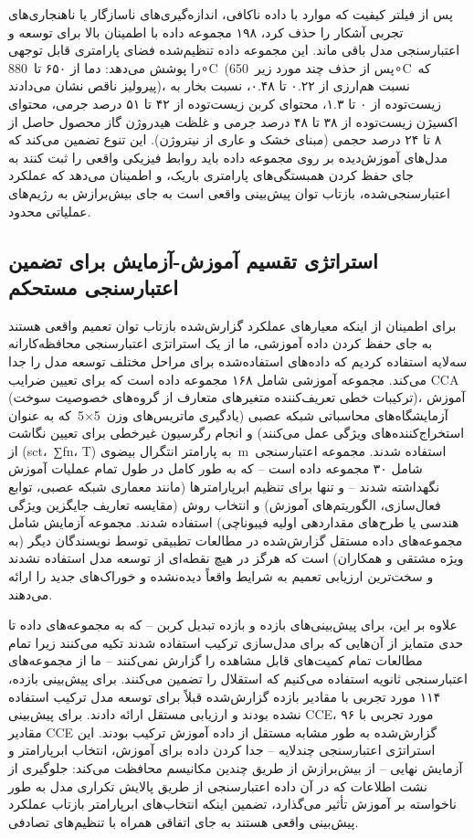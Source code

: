 \documentclass[12pt, a4paper]{article}
\begin{document}
پس از فیلتر کیفیت که موارد با داده ناکافی، اندازه‌گیری‌های ناسازگار یا ناهنجاری‌های تجربی آشکار را حذف کرد، ۱۹۸ مجموعه داده با اطمینان بالا برای توسعه و اعتبارسنجی مدل باقی ماند. این مجموعه داده تنظیم‌شده فضای پارامتری قابل توجهی را پوشش می‌دهد: دما از ۶۵۰ تا 880∘C (پس از حذف چند مورد زیر 650∘C که پیرولیز ناقص نشان می‌دادند)، نسبت هم‌ارزی از ۰.۲۲ تا ۰.۴۸، نسبت بخار به زیست‌توده از ۰ تا ۱.۳، محتوای کربن زیست‌توده از ۴۲ تا ۵۱ درصد جرمی، محتوای اکسیژن زیست‌توده از ۳۸ تا ۴۸ درصد جرمی و غلظت هیدروژن گاز محصول حاصل از ۸ تا ۲۴ درصد حجمی (مبنای خشک و عاری از نیتروژن). این تنوع تضمین می‌کند که مدل‌های آموزش‌دیده بر روی مجموعه داده باید روابط فیزیکی واقعی را ثبت کنند به جای حفظ کردن همبستگی‌های پارامتری باریک، و اطمینان می‌دهد که عملکرد اعتبارسنجی‌شده، بازتاب توان پیش‌بینی واقعی است به جای بیش‌برازش به رژیم‌های عملیاتی محدود.

\subsection{استراتژی تقسیم آموزش-آزمایش برای تضمین اعتبارسنجی مستحکم}

برای اطمینان از اینکه معیارهای عملکرد گزارش‌شده بازتاب توان تعمیم واقعی هستند به جای حفظ کردن داده آموزشی، ما از یک استراتژی اعتبارسنجی محافظه‌کارانه سه‌لایه استفاده کردیم که داده‌های استفاده‌شده برای مراحل مختلف توسعه مدل را جدا می‌کند. مجموعه آموزشی شامل ۱۶۸ مجموعه داده است که برای تعیین ضرایب CCA (ترکیبات خطی تعریف‌کننده متغیرهای متعارف از گروه‌های خصوصیت سوخت)، آموزش آزمایشگاه‌های محاسباتی شبکه عصبی (یادگیری ماتریس‌های وزن 5×5 که به عنوان استخراج‌کننده‌های ویژگی عمل می‌کنند) و انجام رگرسیون غیرخطی برای تعیین نگاشت از (sct، ∑fn، T) به پارامتر انتگرال بیضوی m استفاده شدند. مجموعه اعتبارسنجی شامل ۳۰ مجموعه داده است – که به طور کامل در طول تمام عملیات آموزش نگهداشته شدند – و تنها برای تنظیم ابرپارامترها (مانند معماری شبکه عصبی، توابع فعال‌سازی، الگوریتم‌های آموزش) و انتخاب روش (مقایسه تعاریف جایگزین ویژگی هندسی یا طرح‌های مقداردهی اولیه فیبوناچی) استفاده شدند. مجموعه آزمایش شامل مجموعه‌های داده مستقل گزارش‌شده در مطالعات تطبیقی توسط نویسندگان دیگر (به ویژه مشتقی و همکاران) است که هرگز در هیچ نقطه‌ای از توسعه مدل استفاده نشدند و سخت‌ترین ارزیابی تعمیم به شرایط واقعاً دیده‌نشده و خوراک‌های جدید را ارائه می‌دهند.

علاوه بر این، برای پیش‌بینی‌های بازده و بازده تبدیل کربن – که به مجموعه‌های داده تا حدی متمایز از آن‌هایی که برای مدل‌سازی ترکیب استفاده شدند تکیه می‌کنند زیرا تمام مطالعات تمام کمیت‌های قابل مشاهده را گزارش نمی‌کنند – ما از مجموعه‌های اعتبارسنجی ثانویه استفاده می‌کنیم که استقلال را تضمین می‌کنند. برای پیش‌بینی بازده، ۱۱۴ مورد تجربی با مقادیر بازده گزارش‌شده قبلاً برای توسعه مدل ترکیب استفاده نشده بودند و ارزیابی مستقل ارائه دادند. برای پیش‌بینی CCE، ۹۶ مورد تجربی با مقادیر CCE گزارش‌شده به طور مشابه مستقل از داده آموزش ترکیب بودند. این استراتژی اعتبارسنجی چندلایه – جدا کردن داده برای آموزش، انتخاب ابرپارامتر و آزمایش نهایی – از بیش‌برازش از طریق چندین مکانیسم محافظت می‌کند: جلوگیری از نشت اطلاعات که در آن داده اعتبارسنجی از طریق پالایش تکراری مدل به طور ناخواسته بر آموزش تأثیر می‌گذارد، تضمین اینکه انتخاب‌های ابرپارامتر بازتاب عملکرد پیش‌بینی واقعی هستند به جای اتفاقی همراه با تنظیم‌های تصادفی.
\end{document}
